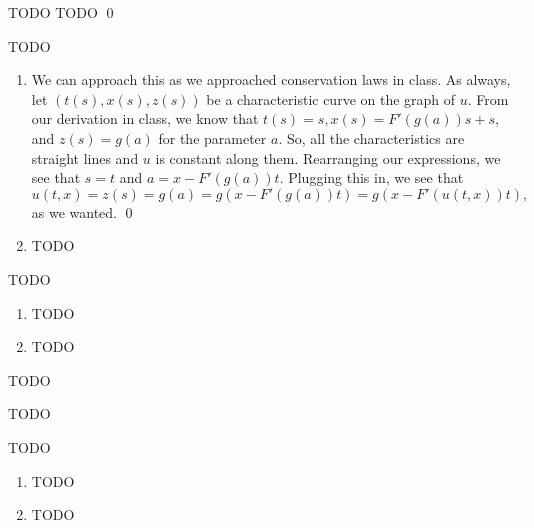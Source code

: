 \documentclass{article}
\begin{document}
\newpage
{} TODO
\hop
\solution
TODO \qed


\newpage
{} TODO
\hop
\solution
\begin{enumerate}
    \item We can approach this as we approached conservation laws in class. As always, let $(t(s), x(s), z(s))$ be a characteristic curve on the graph of $u$. From our derivation in class, we know that $t(s) = s, x(s)= F'(g(a))s + s$, and $z(s) = g(a)$ for the parameter $a$. So, all the characteristics are straight lines and $u$ is constant along them. Rearranging our expressions, we see that $s = t$ and $a = x - F'(g(a))t$. Plugging this in, we see that 
    \[u(t,x) = z(s) = g(a) = g(x - F'(g(a))t) = g(x - F'(u(t,x))t),\]
    as we wanted.  \qed
    \item TODO
\end{enumerate}


\newpage
{} TODO
\hop
\solution
\begin{enumerate}
    \item TODO
    \item TODO
\end{enumerate}


\newpage
{} TODO
\hop
\solution

TODO 


\newpage
{} TODO
\hop
\solution
\begin{enumerate}
    \item TODO
    \item TODO
\end{enumerate}
\end{document}
